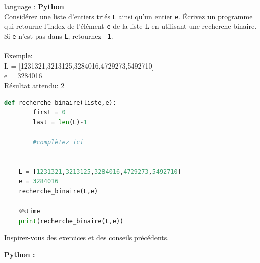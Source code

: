 \begin{Exercice}[10 minutes] language : \textbf{Python}\\

Considérez une liste d’entiers triés \lstinline{L} ainsi qu’un entier \lstinline{e}. Écrivez un programme qui retourne l'index de l'élément \lstinline{e} de la liste L en utilisant une recherche binaire. Si \lstinline{e} n’est pas dans \lstinline{L}, retournez \lstinline{-1}.\\\\

Exemple:\\

    L = [1231321,3213125,3284016,4729273,5492710] \\

    e = 3284016\\

Résultat attendu: 2\\

    \begin{lstlisting}[language=Python]
    def recherche_binaire(liste,e):
        first = 0 
        last = len(L)-1
        
        #complètez ici
    
    
    L = [1231321,3213125,3284016,4729273,5492710]
    e = 3284016
    recherche_binaire(L,e)
    
    %%time
    print(recherche_binaire(L,e))
    \end{lstlisting}

\begin{conseil}
    Inspirez-vous des exercices et des conseils précédents. 
\end{conseil}

    \begin{solution}
        \textbf{Python :}
        
    \end{solution}

\end{Exercice}


